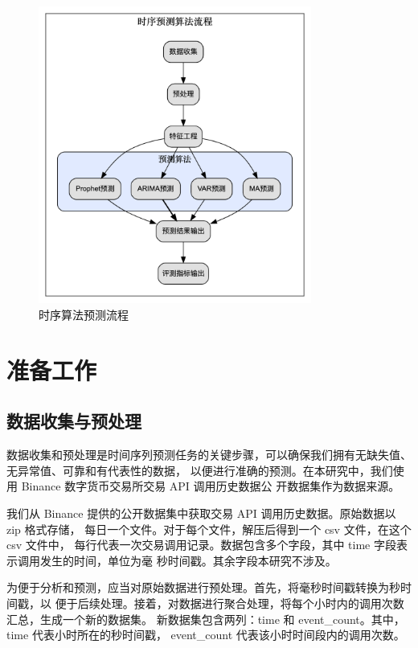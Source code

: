 \documentclass[a4paper,AutoFakeBold,oneside,12pt]{book}
\begin{document}
\begin{figure}[htbp]
	\centering
	\includegraphics[width=0.8\textwidth]{images/algo-process.png}
	\caption{时序算法预测流程}
	\label{fig:algo-process}
  \end{figure}

\section{准备工作}
\subsection{数据收集与预处理}

数据收集和预处理是时间序列预测任务的关键步骤，可以确保我们拥有无缺失值、无异常值、可靠和有代表性的数据，
以便进行准确的预测。在本研究中，我们使用 Binance 数字货币交易所交易 API 调用历史数据公
开数据集作为数据来源。


我们从 Binance 提供的公开数据集中获取交易 API 调用历史数据。原始数据以 zip 格式存储，
每日一个文件。对于每个文件，解压后得到一个 csv 文件，在这个 csv 文件中，
每行代表一次交易调用记录。数据包含多个字段，其中 time 字段表示调用发生的时间，单位为毫
秒时间戳。其余字段本研究不涉及。

为便于分析和预测，应当对原始数据进行预处理。首先，将毫秒时间戳转换为秒时间戳，以
便于后续处理。接着，对数据进行聚合处理，将每个小时内的调用次数汇总，生成一个新的数据集。
新数据集包含两列：time 和 event\_count。其中，time 代表小时所在的秒时间戳，
event\_count 代表该小时时间段内的调用次数。
\end{document}
